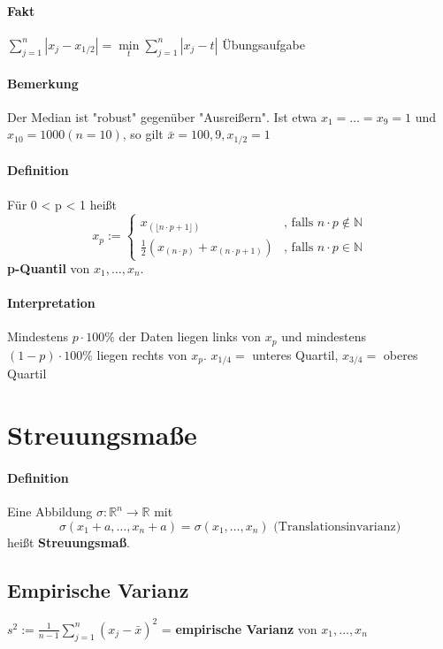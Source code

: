 \documentclass[a4paper,11pt,notitlepage]{report}
\newcommand{\R}{{\ensuremath{\mathbb{R}}}}
\newcommand{\N}{{\ensuremath{\mathbb{N}}}}
\begin{document}
\paragraph{Fakt}
$\sum\limits_{j=1}^{n}{|x_j - x_{1/2}|} = \min\limits_{t}{\sum\limits_{j=1}^{n}{|x_j - t|}}$ Übungsaufgabe

\paragraph{Bemerkung}
Der Median ist "robust" gegenüber "Ausreißern".
Ist etwa $x_1 = \ldots = x_9 = 1$ und $x_{10} = 1000 (n=10)$, so gilt $\bar{x} = 100,9  , x_{1/2} = 1$

\paragraph{Definition}
Für 0 < p < 1 heißt
$$
x_p := \begin{cases}
	x_{(\lfloor n \cdot p + 1 \rfloor )} & \text{, falls } n \cdot p \notin \N \\
	\frac{1}{2}(x_{(n \cdot p)} + x_{(n \cdot p + 1)}) & \text{, falls } n \cdot p \in \N
\end{cases}
$$
\textbf{p-Quantil} von $x_1, \ldots, x_n$.

\paragraph{Interpretation}
Mindestens $p \cdot 100 \%$ der Daten liegen links von $x_p$ und mindestens $(1-p) \cdot 100 \%$ liegen rechts von $x_p$. \newline
$x_{1/4}=$ unteres Quartil, $x_{3/4}=$ oberes Quartil

\section{Streuungsmaße}
\paragraph{Definition}
Eine Abbildung $\sigma \colon \R^n \rightarrow \R$ mit $$\sigma(x_1+a,\ldots,x_n+a) = \sigma(x_1,\ldots,x_n)\text{ (Translationsinvarianz)}$$ heißt \textbf{Streuungsmaß}.

\subsection{Empirische Varianz}
$s^2 := \frac{1}{n-1} \sum\limits_{j=1}^{n}{(x_j - \bar{x})^2}$ = \textbf{empirische Varianz} von $x_1,\ldots,x_n$
\end{document}
